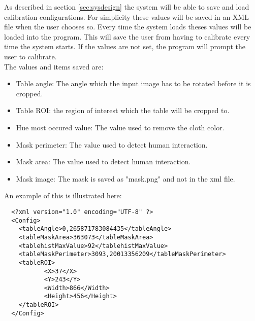 As described in section \ref{sec:sysdesign} the system will be able to save and load calibration configurations. For simplicity these values will be saved in an XML file when the user chooses so. Every time the system loads theses values will be loaded into the program. This will save the user from having to calibrate every time the system starts. If the values are not set, the program will prompt the user to calibrate.\\

The values and items saved are:
\begin{itemize}
	\item Table angle: The angle which the input image has to be rotated before it is cropped.
	\item Table ROI: the region of interest which the table will be cropped to.
	\item Hue most occured value: The value used to remove the cloth color.
	\item Mask perimeter: The value used to detect human interaction.
	\item Mask area: The value used to detect human interaction.
	\item Mask image: The mask is saved as "mask.png" and not in the xml file.
\end{itemize}

An example of this is illustrated here:

\lstset{language=XML}
\begin{lstlisting}
  <?xml version="1.0" encoding="UTF-8" ?> 
  <Config>
  	<tableAngle>0,265871783084435</tableAngle> 
  	<tableMaskArea>363073</tableMaskArea> 
  	<tablehistMaxValue>92</tablehistMaxValue> 
  	<tableMaskPerimeter>3093,20013356209</tableMaskPerimeter> 
  	<tableROI>
		   <X>37</X> 
		   <Y>243</Y> 
		   <Width>866</Width> 
		   <Height>456</Height> 
    </tableROI>
  </Config>
\end{lstlisting}

